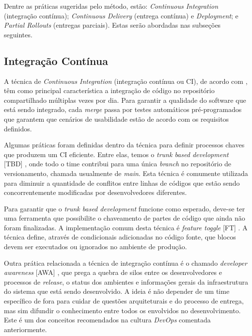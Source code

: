Dentre as práticas sugeridas pelo método, estão: \emph{Continuous Integration} (integração contínua);  \emph{Continuous Delivery} (entrega contínua) e \emph{Deployment}; e \emph{Partial Rollouts} (entregas parciais). Estas serão abordadas nas subseções seguintes.

\subsection{Integração Contínua}

A técnica de \emph{Continuous Integration} (integração contínua ou CI), de acordo com \cite{fowlerCI}, têm como principal característica a integração de código no repositório compartilhado múltiplas vezes por dia. Para garantir a qualidade do software que está sendo integrado, cada \emph{merge} passa por testes automáticos pré-programados que garantem que cenários de usabilidade estão de acordo com os requisitos definidos. 

Algumas práticas foram definidas dentro da técnica para definir processos chaves que produzem um CI eficiente. Entre elas, temos o \emph{trunk based development} [TBD] \cite{devAndDeploymentFB}, onde todo o time contribui para uma única \emph{branch} no repositório de versionamento, chamada usualmente de \emph{main}. Esta técnica é comumente utilizada para diminuir a quantidade de conflitos entre linhas de códigos que estão sendo concorrentemente modificadas por desenvolvedores diferentes. 

Para garantir que o \emph{trunk based development} funcione como esperado, deve-se ter uma ferramenta que possibilite o chaveamento de partes de código que ainda não foram finalizadas. A implementação comum desta técnica é \emph{feature toggle} [FT] \cite{featureToggles}. A técnica define, através de condicionais adicionadas no código fonte, que blocos devem ser executados ou ignorados no ambiente de produção.

Outra prática relacionada a técnica de integração contínua é o chamado \emph{developer awareness} [AWA] \cite{awa}, que prega a quebra de silos entre os desenvolvedores e processos de \emph{release}, o status dos ambientes e informações gerais da infraestrutura do sistema que está sendo desenvolvido. A ideia é não depender de um time específico de fora para cuidar de questões arquiteturais e do processo de entrega, mas sim difundir o conhecimento entre todos os envolvidos no desenvolvimento. Este é um dos conceitos recomendados na cultura \emph{DevOps} comentada anteriormente.

